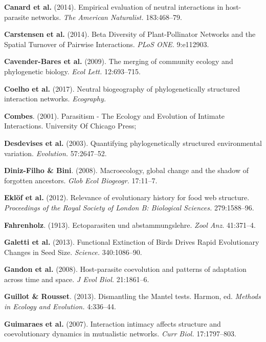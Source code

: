 \documentclass[12pt]{article}
\begin{document}
\hypertarget{ref-cana14een}{}
\textbf{Canard et al.} (2014). Empirical evaluation of neutral
interactions in host-parasite networks. \emph{The American Naturalist.}
183:468--79.

\hypertarget{ref-cars14bdp}{}
\textbf{Carstensen et al.} (2014). Beta Diversity of Plant-Pollinator
Networks and the Spatial Turnover of Pairwise Interactions. \emph{PLoS
ONE.} 9:e112903.

\hypertarget{ref-cave09mce}{}
\textbf{Cavender-Bares et al.} (2009). The merging of community ecology
and phylogenetic biology. \emph{Ecol Lett.} 12:693--715.

\hypertarget{ref-coel17nbp}{}
\textbf{Coelho et al.} (2017). Neutral biogeography of phylogenetically
structured interaction networks. \emph{Ecography.}

\hypertarget{ref-comb01pee}{}
\textbf{Combes}. (2001). Parasitism - The Ecology and Evolution of
Intimate Interactions. University Of Chicago Press;

\hypertarget{ref-desd03qps}{}
\textbf{Desdevises et al.} (2003). Quantifying phylogenetically
structured environmental variation. \emph{Evolution.} 57:2647--52.

\hypertarget{ref-dini08mgc}{}
\textbf{Diniz-Filho \& Bini}. (2008). Macroecology, global change and
the shadow of forgotten ancestors. \emph{Glob Ecol Biogeogr.} 17:11--7.

\hypertarget{ref-eklo12reh}{}
\textbf{Eklöf et al.} (2012). Relevance of evolutionary history for food
web structure. \emph{Proceedings of the Royal Society of London B:
Biological Sciences.} 279:1588--96.

\hypertarget{ref-fahr13eua}{}
\textbf{Fahrenholz}. (1913). Ectoparasiten und abstammungslehre.
\emph{Zool Anz.} 41:371--4.

\hypertarget{ref-gale13feb}{}
\textbf{Galetti et al.} (2013). Functional Extinction of Birds Drives
Rapid Evolutionary Changes in Seed Size. \emph{Science.} 340:1086--90.

\hypertarget{ref-gand08hcp}{}
\textbf{Gandon et al.} (2008). Host-parasite coevolution and patterns of
adaptation across time and space. \emph{J Evol Biol.} 21:1861--6.

\hypertarget{ref-guil13dmt}{}
\textbf{Guillot \& Rousset}. (2013). Dismantling the Mantel tests.
Harmon, ed. \emph{Methods in Ecology and Evolution.} 4:336--44.

\hypertarget{ref-guim07iia}{}
\textbf{Guimaraes et al.} (2007). Interaction intimacy affects structure
and coevolutionary dynamics in mutualistic networks. \emph{Curr Biol.}
17:1797--803.
\end{document}
